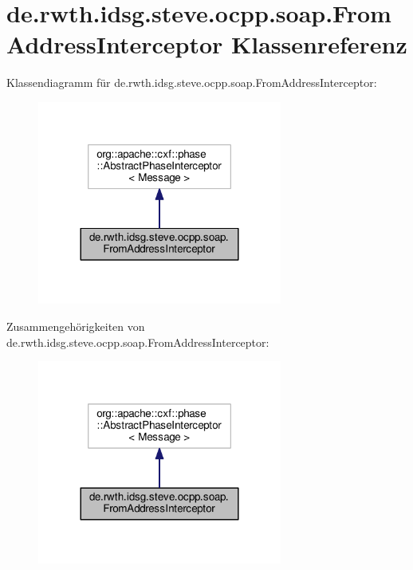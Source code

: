 \hypertarget{classde_1_1rwth_1_1idsg_1_1steve_1_1ocpp_1_1soap_1_1_from_address_interceptor}{\section{de.\-rwth.\-idsg.\-steve.\-ocpp.\-soap.\-From\-Address\-Interceptor Klassenreferenz}
\label{classde_1_1rwth_1_1idsg_1_1steve_1_1ocpp_1_1soap_1_1_from_address_interceptor}
}


Klassendiagramm für de.\-rwth.\-idsg.\-steve.\-ocpp.\-soap.\-From\-Address\-Interceptor\-:
\nopagebreak
\begin{figure}[H]
\begin{center}
\leavevmode
\includegraphics[width=228pt]{classde_1_1rwth_1_1idsg_1_1steve_1_1ocpp_1_1soap_1_1_from_address_interceptor__inherit__graph}
\end{center}
\end{figure}


Zusammengehörigkeiten von de.\-rwth.\-idsg.\-steve.\-ocpp.\-soap.\-From\-Address\-Interceptor\-:
\nopagebreak
\begin{figure}[H]
\begin{center}
\leavevmode
\includegraphics[width=228pt]{classde_1_1rwth_1_1idsg_1_1steve_1_1ocpp_1_1soap_1_1_from_address_interceptor__coll__graph}
\end{center}
\end{figure}
